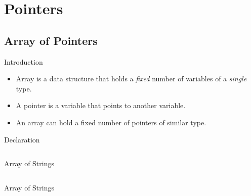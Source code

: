 \documentclass[compress]{beamer}
\begin{document}
\prepareCover

\section{Pointers}

\subsection{Array of Pointers}

\begin{slide}
	\begin{block}{Introduction}

	\begin{itemize}
	\item[] Array is a data structure that holds a \emph{fixed} number of variables of a \emph{single} type.
	\item[] A pointer is a \alert{variable} that points to another variable.
	\item[] An array can hold a fixed number of pointers of similar type.
	\end{itemize}

	\end{block}
\end{slide}

\begin{slide}
	\begin{block}{Declaration}

	\inputminted[fontsize=\footnotesize, firstline=10, linenos]{c}{
		\resDirectory/array1.c
	}

	\end{block}
\end{slide}

\begin{slide}
	\begin{block}{Array of Strings}

	\inputminted[fontsize=\footnotesize, firstline=10, linenos]{c}{
		\resDirectory/array2.c
	}

	\end{block}
\end{slide}

\begin{slide}
	\begin{block}{Array of Strings}

	\inputminted[fontsize=\footnotesize, firstline=10, linenos]{c}{
		\resDirectory/array3.c
	}

	\end{block}
\end{slide}
\end{document}
